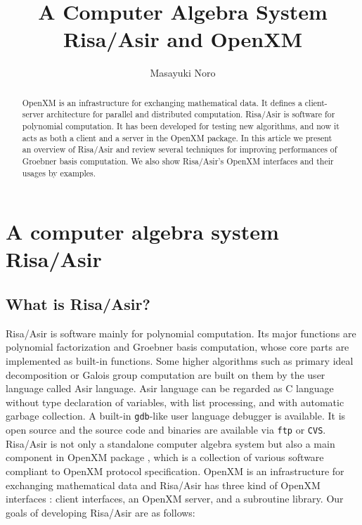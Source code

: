 \documentclass[runningheads]{cl2emult}
\begin{document}
%
\title*{A Computer Algebra System Risa/Asir and OpenXM}
%
%
%
%
%
\author{Masayuki Noro}
%
%
%

\maketitle              %

\begin{abstract}
OpenXM \cite{OPENXM} is an infrastructure for exchanging mathematical
data.  It defines a client-server architecture for parallel and
distributed computation.  Risa/Asir is software for polynomial
computation. It has been developed for testing new algorithms, and now
it acts as both a client and a server in the OpenXM package. In this
article we present an overview of Risa/Asir and review several
techniques for improving performances of Groebner basis computation.
We also show Risa/Asir's OpenXM interfaces and their usages by
examples.
\end{abstract}

\section{A computer algebra system Risa/Asir}

\subsection{What is Risa/Asir?}

Risa/Asir \cite{RISA} is software mainly for polynomial
computation. Its major functions are polynomial factorization and
Groebner basis computation, whose core parts are implemented as
built-in functions.  Some higher algorithms such as primary ideal
decomposition or Galois group computation are built on them by the
user language called Asir language. Asir language can be regarded as C
language without type declaration of variables, with list processing,
and with automatic garbage collection. A built-in {\tt gdb}-like user
language debugger is available. It is open source and the source code
and binaries are available via {\tt ftp} or {\tt CVS}.  Risa/Asir is
not only a standalone computer algebra system but also a main
component in OpenXM package \cite{OPENXM}, which is a collection of
various software compliant to OpenXM protocol specification.  OpenXM
is an infrastructure for exchanging mathematical data and Risa/Asir
has three kind of OpenXM interfaces : client interfaces, an OpenXM
server, and a subroutine library. Our goals of developing Risa/Asir
are as follows:
\end{document}
